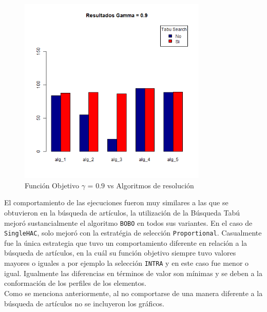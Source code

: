 \begin{figure}[H]
  \centering
    \includegraphics[width=0.8\textwidth]{resultados/authors/Graficos_agrupados/gamma09-autores.png}
  \caption{Función Objetivo $\gamma$ = $0.9$ vs Algoritmos de resolución}
  \label{res:img-autores-agr-gamma09}
\end{figure}

El comportamiento de las ejecuciones fueron muy similares a las que se obtuvieron en la búsqueda de artículos, la utilización de la Búsqueda Tabú mejoró sustancialmente el algoritmo \texttt{BOBO} en todos sus variantes. En el caso de \texttt{SingleHAC}, solo mejoró con la estratégia de selección \texttt{Proportional}. Casualmente fue la única estrategia que tuvo un comportamiento diferente en relación a la búsqueda de artículos, en la cuál su función objetivo siempre tuvo valores mayores o iguales a por ejemplo la selección \texttt{INTRA} y en este caso fue menor o igual. Igualmente las diferencias en términos de valor son mínimas y se deben a la conformación de los perfiles de los elementos.\\
Como se menciona anteriormente, al no comportarse de una manera diferente a la búsqueda de artículos no se incluyeron los gráficos.
\newpage
